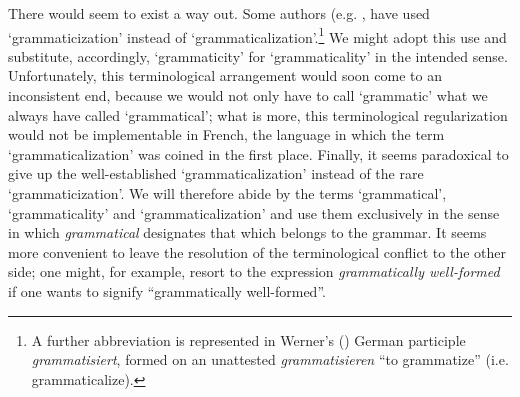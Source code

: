 There would seem to exist a way out. Some authors (e.g. \citet[49]{Givón1975}, \citet[489]{Bolinger1978} have used ‘grammaticization’ instead of ‘grammaticalization’.\footnote{A further abbreviation is represented in Werner's (\citeyear[965f]{Werner1979}) German participle \textit{grammatisiert}, formed on an unattested \textit{grammatisieren} “to grammatize” (i.e. grammaticalize).} We might adopt this use and substitute, accordingly, ‘grammaticity’ for ‘grammaticality’ in the intended sense. Unfortunately, this terminological arrangement would soon come to an inconsistent end, because we would not only have to call ‘grammatic’ what we always have called ‘grammatical’; what is more, this terminological regularization would not be implementable in French, the language in which the term ‘grammaticalization’ was coined in the first place. Finally, it seems paradoxical to give up the well-established ‘grammaticalization’ instead of the rare ‘grammaticization’. We will therefore abide by the terms ‘grammatical’, ‘grammaticality’ and ‘grammaticalization’ and use them exclusively in the sense in which \textit{grammatical} designates that which belongs to the grammar. It seems more convenient to leave the resolution of the terminological conflict to the other side; one might, for example, resort to the expression \textit{grammatically well-formed} if one wants to signify “grammatically well-formed”.

